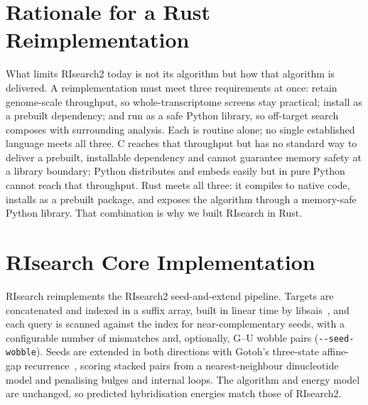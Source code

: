 \section{Rationale for a Rust Reimplementation}\label{sec:rationale}

What limits RIsearch2 today is not its algorithm but how that algorithm is delivered.
A reimplementation must meet three requirements at once: retain genome-scale throughput, so whole-transcriptome screens stay practical; install as a prebuilt dependency; and run as a safe Python library, so off-target search composes with surrounding analysis.
Each is routine alone; no single established language meets all three.
C reaches that throughput but has no standard way to deliver a prebuilt, installable dependency and cannot guarantee memory safety at a library boundary; Python distributes and embeds easily but in pure Python cannot reach that throughput.
Rust meets all three: it compiles to native code, installs as a prebuilt package, and exposes the algorithm through a memory-safe Python library.
That combination is why we built RIsearch in Rust.

\section{RIsearch Core Implementation}\label{sec:core}\label{subsec:pybindings}

RIsearch reimplements the RIsearch2 seed-and-extend pipeline.
Targets are concatenated and indexed in a suffix array, built in linear time by libsais~\citep{libsais}, and each query is scanned against the index for near-complementary seeds, with a configurable number of mismatches and, optionally, G--U wobble pairs (\texttt{-{}-seed-wobble}).
Seeds are extended in both directions with Gotoh's three-state affine-gap recurrence~\citep{gotoh1982improved}, scoring stacked pairs from a nearest-neighbour dinucleotide model and penalising bulges and internal loops.
The algorithm and energy model are unchanged, so predicted hybridisation energies match those of RIsearch2.


